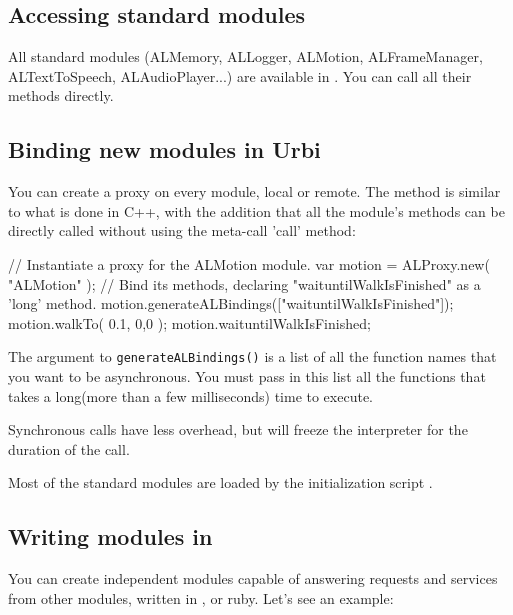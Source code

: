 \subsection{Accessing standard \naoqi modules}

All standard \naoqi modules (ALMemory, ALLogger, ALMotion, ALFrameManager,
ALTextToSpeech, ALAudioPlayer...) are available in \urbi. You can call all
their methods directly.

\subsection{Binding new \naoqi modules in Urbi}

You can create a proxy on every \naoqi module, local or remote.
The method is similar to what is done in C++, with the addition that all the
module's methods can be directly called without using the meta-call 'call'
method:

\begin{urbiunchecked}
// Instantiate a proxy for the ALMotion module.
var motion = ALProxy.new( "ALMotion" );
// Bind its methods, declaring "waituntilWalkIsFinished" as a 'long' method.
motion.generateALBindings(["waituntilWalkIsFinished"]);
motion.walkTo( 0.1, 0,0 );
motion.waituntilWalkIsFinished;
\end{urbiunchecked}

The argument to \lstinline|generateALBindings()| is a list of all the
function names that you want to be asynchronous. You must pass in this
list all the functions that takes a long(more than a few milliseconds)
time to execute.

Synchronous calls have less overhead, but will freeze the \us
interpreter for the duration of the call.

Most of the standard modules are loaded by the initialization script
.

\subsection{Writing \naoqi modules in \urbi}

You can create independent modules capable of answering requests and
services from other \naoqi modules, written in \Cxx, \us or
ruby. Let's see an example:

